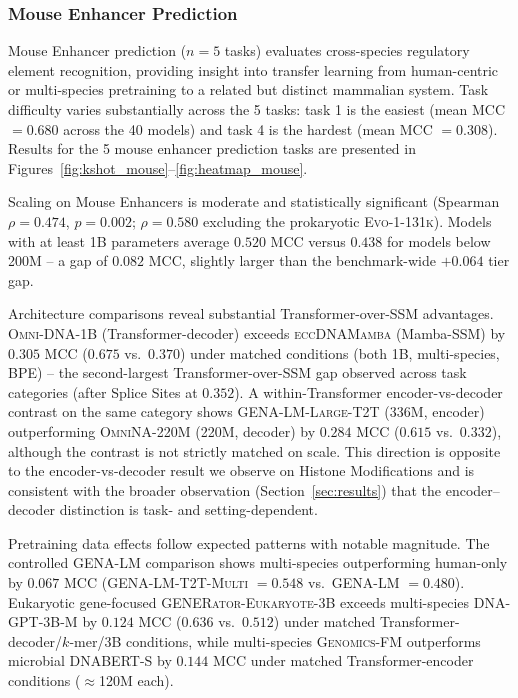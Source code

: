 \documentclass{article}
\theoremstyle{plain}
\theoremstyle{definition}
\theoremstyle{remark}
\begin{document}
\newpage

\subsubsection{Mouse Enhancer Prediction}

Mouse Enhancer prediction ($n=5$ tasks) evaluates cross-species
regulatory element recognition, providing insight into transfer
learning from human-centric or multi-species pretraining to a
related but distinct mammalian system. Task difficulty varies
substantially across the 5 tasks: task 1 is the easiest (mean MCC
$= 0.680$ across the 40 models) and task 4 is the hardest (mean
MCC $= 0.308$). Results for the 5 mouse enhancer prediction tasks
are presented in
Figures~\ref{fig:kshot_mouse}--\ref{fig:heatmap_mouse}.


Scaling on Mouse Enhancers is moderate and statistically
significant (Spearman $\rho = 0.474$, $p = 0.002$; $\rho = 0.580$
excluding the prokaryotic \textsc{Evo-1-131k}). Models with at
least 1B parameters average $0.520$ MCC versus $0.438$ for models
below 200M -- a gap of $0.082$ MCC, slightly larger than the
benchmark-wide $+0.064$ tier gap.

Architecture comparisons reveal substantial Transformer-over-SSM
advantages. \textsc{Omni-DNA-1B} (Transformer-decoder) exceeds
\textsc{eccDNAMamba} (Mamba-SSM) by $0.305$ MCC ($0.675$
vs.\ $0.370$) under matched conditions (both 1B, multi-species,
BPE) -- the second-largest Transformer-over-SSM gap observed
across task categories (after Splice Sites at $0.352$). A
within-Transformer encoder-vs-decoder contrast on the same
category shows \textsc{GENA-LM-Large-T2T} (336M, encoder)
outperforming \textsc{OmniNA-220M} (220M, decoder) by $0.284$ MCC
($0.615$ vs.\ $0.332$), although the contrast is not strictly
matched on scale. This direction is opposite to the
encoder-vs-decoder result we observe on Histone Modifications and
is consistent with the broader observation
(Section~\ref{sec:results}) that the encoder--decoder distinction
is task- and setting-dependent.


Pretraining data effects follow expected patterns with notable
magnitude. The controlled \textsc{GENA-LM} comparison shows
multi-species outperforming human-only by $0.067$ MCC
(\textsc{GENA-LM-T2T-Multi} $= 0.548$ vs.\ \textsc{GENA-LM} $=
0.480$). Eukaryotic gene-focused \textsc{GENERator-Eukaryote-3B}
exceeds multi-species \textsc{DNA-GPT-3B-M} by $0.124$ MCC ($0.636$
vs.\ $0.512$) under matched Transformer-decoder/$k$-mer/3B
conditions, while multi-species \textsc{Genomics-FM} outperforms
microbial \textsc{DNABERT-S} by $0.144$ MCC under matched
Transformer-encoder conditions ($\approx$120M each).
\end{document}
